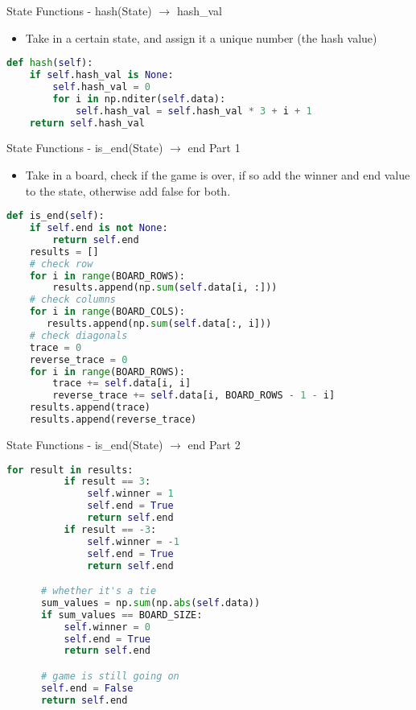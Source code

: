 \documentclass{beamer}
\begin{document}
    \begin{frame}[fragile]{State Functions - hash(State) $\to$ hash\_val}
 		\begin{itemize}
 			\item Take in a certain state, and assign it a unique number (the hash value)
 		\end{itemize}
 		\begin{lstlisting}[language=Python]
def hash(self):
    if self.hash_val is None:
        self.hash_val = 0
        for i in np.nditer(self.data):
            self.hash_val = self.hash_val * 3 + i + 1
    return self.hash_val
\end{lstlisting}
  \end{frame}
  \begin{frame}[fragile]{State Functions - is\_end(State) $\to$ end Part 1}
  \begin{itemize}
  	\item Take in a board, check if the game is over, if so add the winner and end value to the state, otherwise add false for both.
  \end{itemize}
  \begin{lstlisting}[language=Python]
def is_end(self):
    if self.end is not None:
        return self.end
    results = []
    # check row
    for i in range(BOARD_ROWS):
        results.append(np.sum(self.data[i, :]))
    # check columns
    for i in range(BOARD_COLS):
       results.append(np.sum(self.data[:, i]))
    # check diagonals
    trace = 0
    reverse_trace = 0
    for i in range(BOARD_ROWS):
        trace += self.data[i, i]
        reverse_trace += self.data[i, BOARD_ROWS - 1 - i]
    results.append(trace)
    results.append(reverse_trace)
\end{lstlisting}
  	  \end{frame}
  \begin{frame}[fragile]{State Functions - is\_end(State) $\to$ end Part 2}
  \begin{lstlisting}[language=Python]
      for result in results:
          if result == 3:
              self.winner = 1
              self.end = True
              return self.end
          if result == -3:
              self.winner = -1
              self.end = True
              return self.end

      # whether it's a tie
      sum_values = np.sum(np.abs(self.data))
      if sum_values == BOARD_SIZE:
          self.winner = 0
          self.end = True
          return self.end

      # game is still going on
      self.end = False
      return self.end
  \end{lstlisting}
  	  \end{frame}
\end{document}
